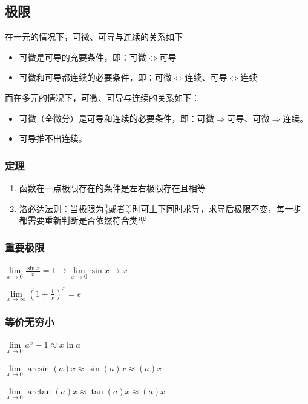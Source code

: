 \documentclass[UTF8]{ctexbook}
\newcommand{\limNormal}[1]{\lim\limits_{#1}}
\newcommand{\myLimToZero}{\limNormal{x \to 0}}
\newcommand{\myLimToInf}{\limNormal{x \to \infty}}
\begin{document}
{{\subsection{极限}{

  在一元的情况下，可微、可导与连续的关系如下

  \begin{itemize}
    \item 可微是可导的充要条件，即：可微$\Leftrightarrow$可导
    \item 可微和可导都连续的必要条件，即：可微$\Leftrightarrow$连续、可导$\Leftrightarrow$连续
  \end{itemize}

  而在多元的情况下，可微、可导与连续的关系如下：

  \begin{itemize}
    \item 可微（全微分）是可导和连续的必要条件，即：可微$\Rightarrow$可导、可微$\Rightarrow$连续。
    \item 可导推不出连续。
  \end{itemize}

  \subsubsection{定理}{
    \begin{enumerate}
      \item 函数在一点极限存在的条件是左右极限存在且相等
      \item 洛必达法则：当极限为$\frac{0}{0}$或者$\frac{\infty}{\infty}$时可上下同时求导，求导后极限不变，每一步都需要重新判断是否依然符合类型
    \end{enumerate}
  }%

  \subsubsection{重要极限}{
    $\myLimToZero\frac{\sin{x}}{x}=1 \to \limNormal{x \to 0}\sin{x} \to x$

    $\myLimToInf(1+\frac{1}{x})^x = e$
  }%

  \subsubsection{等价无穷小}{
    $\myLimToZero a^x - 1 \approx x\ln{a}$

    $\myLimToZero \arcsin(a)x \approx \sin(a)x \approx (a)x$

    $\myLimToZero \arctan(a)x \approx \tan(a)x \approx (a)x$

}}}}
\end{document}
